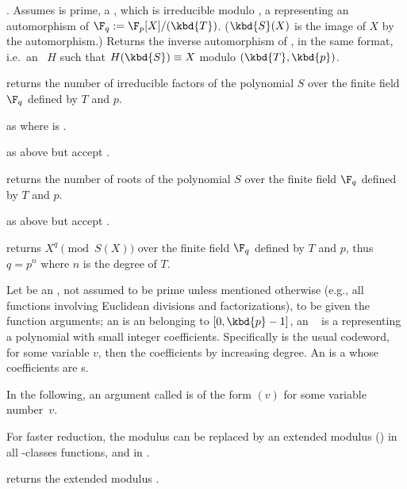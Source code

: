 . Assumes  is prime,
 a , which is irreducible modulo ,  a
 representing an automorphism of $\F_q := \F_p[X]/(\kbd{T})$.
($\kbd{S}(X)$ is the image of $X$ by the automorphism.) Returns the
inverse automorphism of , in the same format, i.e.~an ~$H$
such that $H(\kbd{S}) \equiv X$ modulo $(\kbd{T}, \kbd{p})$.

 returns the number of
irreducible factors of the polynomial $S$ over the finite field $\F_q$
defined by $T$ and $p$.

 as
 where  is .

 as above but accept .

 returns the number of roots of
the polynomial $S$ over the finite field $\F_q$ defined by $T$ and $p$.

 as above but accept .

 returns
$X^{q}\pmod{S(X)}$ over the finite field $\F_q$ defined by $T$ and $p$, thus
$q=p^n$ where $n$ is the degree of $T$.

 Let  be an , not assumed to be
prime unless mentioned otherwise (e.g., all functions involving Euclidean
divisions and factorizations), to be given the function arguments; an
 is an  belonging to $[0,\kbd{p}-1]$, an ~
is a  representing a polynomial with small integer
coefficients. Specifically  is the usual codeword,  for some variable $v$, then the coefficients by increasing
degree. An  is a  whose coefficients are s.

\noindent In the following, an argument called  is of the form
$(v)$ for some variable number~$v$.


For faster reduction, the modulus  can be replaced by an extended
modulus () in all -classes functions, and in
.

 returns the extended modulus .

